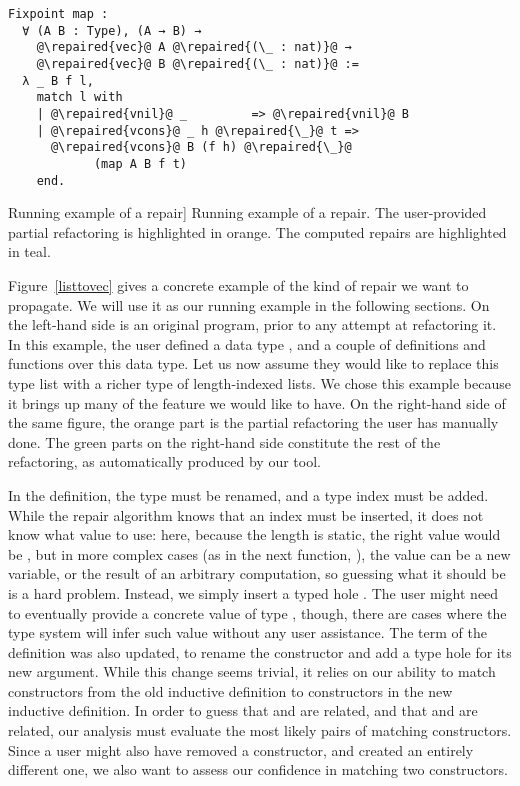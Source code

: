 \begin{figure*}[!htp]
{\begin{minipage}[t]{0.50\textwidth-2\fboxrule-2\fboxsep}
\begin{verbatim}
Fixpoint map :
  ∀ (A B : Type), (A → B) →
    @\repaired{vec}@ A @\repaired{(\_ : nat)}@ →
    @\repaired{vec}@ B @\repaired{(\_ : nat)}@ :=
  λ _ B f l,
    match l with
    | @\repaired{vnil}@ _         => @\repaired{vnil}@ B
    | @\repaired{vcons}@ _ h @\repaired{\_}@ t =>
      @\repaired{vcons}@ B (f h) @\repaired{\_}@
            (map A B f t)
    end.
  \end{verbatim}
\end{minipage}}

\caption%
[Running example of a \Chick{} repair]
{Running example of a \Chick{} repair.  The user-provided partial refactoring is highlighted in orange.  The computed repairs are highlighted in teal.}~\label{listtovec}

\end{figure*}

Figure~\ref{listtovec} gives a concrete example of the kind of repair we want to
propagate.  We will use it as our running example in the following sections.  On
the left-hand side is an original program, prior to any attempt at refactoring
it.  In this example, the user defined a data type , and a
couple of definitions and functions over this data type.  Let us now assume they
would like to replace this type list with a richer type of length-indexed lists.
We chose this example because it brings up many of the feature we would like to
have.  On the right-hand side of the same figure, the orange part is the partial
refactoring the user has manually done.  The green parts on the right-hand side
constitute the rest of the refactoring, as automatically produced by our tool.

In the  definition, the type must be renamed, and a type index
must be added.  While the repair algorithm knows that an index must be inserted,
it does not know what value to use: here, because the length is static, the
right value would be , but in more complex cases (as in the next
function, ), the value can be a new variable, or the result of
an arbitrary computation, so guessing what it should be is a hard problem.
Instead, we simply insert a typed hole .  The user might
need to eventually provide a concrete value of type , though,
there are cases where the type system will infer such value without any user
assistance.  The term of the definition was also updated, to rename the
constructor and add a type hole for its new argument.  While this change seems
trivial, it relies on our ability to match constructors from the old inductive
definition to constructors in the new inductive definition.  In order to guess
that  and  are related, and that 
and  are related, our analysis must evaluate the most likely
pairs of matching constructors.  Since a user might also have removed a
constructor, and created an entirely different one, we also want to assess our
confidence in matching two constructors.

